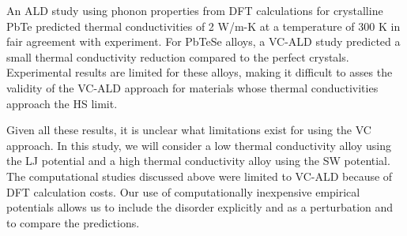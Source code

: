 \documentclass[12pt,twocolumn,iop]{/usr/share/texmf-texlive/tex/latex/iop/iopart}[/usr/share/texmf-texlive/tex/latex/iop/]
\begin{document}
An ALD study using phonon properties from DFT calculations for 
crystalline PbTe\cite{shiga_microscopic_2012} predicted 
thermal conductivities of 2 W/m-K at a temperature of 300 K 
in fair agreement with experiment. 
For PbTeSe alloys, a VC-ALD 
study predicted a small thermal conductivity reduction compared to the 
perfect crystals.\cite{tian_phonon_2012} Experimental results are limited 
for these alloys,\cite{kudman_thermoelectric_1972,pei_convergence_2011} 
making it difficult to asses the validity of the VC-ALD approach for 
materials whose thermal conductivities approach the HS limit.

Given all these results, it is unclear what limitations exist for 
using the VC approach. 
In this study, we will consider a low thermal conductivity alloy  
using the LJ potential and a high thermal conductivity alloy using the 
SW potential. The computational studies discussed above were 
limited to VC-ALD 
because of DFT calculation costs. Our use of computationally 
inexpensive empirical potentials allows us to include the disorder 
explicitly and as a perturbation and to compare the predictions. 


\end{document}
